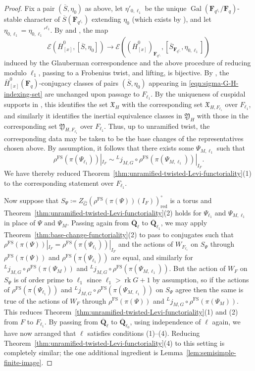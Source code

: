 \documentclass[reqno]{amsart}
\numberwithin{equation}{subsection}
\newcommand{\F}{\mathbf{F}}
\newcommand{\Q}{\mathbf{Q}}
\newcommand{\Gal}{\operatorname{Gal}}
\newcommand{\ol}[1]{\overline{#1}}
\newcommand{\wh}[1]{\widehat{#1}}
\newcommand{\ld}{{}^L}
\newcommand\cE{\mathcal{E}}
\DeclareMathOperator{\FS}{FS}
\DeclareMathOperator{\red}{red}
\DeclareMathOperator{\rk}{rk}
\theoremstyle{remark}
\numberwithin{equation}{subsection}
\numberwithin{figure}{subsection}
\begin{document}
\begin{proof}
Fix a pair $(\ol S, \eta_0)$ as above, let $\eta'_{0,\ell_1}$ be the unique $\Gal(\F_{q^{\ell_1}}/\F_q)$-stable character of $\ol S(\F_{q^{\ell_1}})$ extending $\eta_0$ (which exists by \cite[Proposition~4.3.4(1)]{Cot26b}), and let $\eta_{0,\ell_1} = \eta_{0,\ell_1}'^{\ell_1}$. By \cite[Corollary~4.4.1]{Cot26b} and \cite[Part III, no.\ 15.5, Proposition 43]{Serre77}, the map
\[
\cE(\ol H^0_{[x]}, [\ol S, \eta_0]) \to \cE((\ol H^0_{[x]})_{\F_{q^{\ell_1}}}, [\ol S_{\F_{q^{\ell_1}}}, \eta_{0,\ell_1}])
\]
induced by the Glauberman correspondence and the above procedure of reducing modulo $\ell_1$, passing to a Frobenius twist, and lifting, is bijective. By \cite[Corollary~4.4.2]{Cot26b}, the $\ol H^0_{[x]}(\F_q)$-conjugacy classes of pairs $(\ol S,\eta_0)$ appearing in \eqref{eqn:sigma-G-H-indexing-set} are unchanged upon passage to $F_{\ell_1}$. By the uniqueness of cuspidal supports in \cite[Lemma~2.10.2]{Cot26b}, this identifies the set $\mathfrak{X}_H$ with the corresponding set $\mathfrak{X}_{H,F_{\ell_1}}$ over $F_{\ell_1}$, and similarly it identifies the inertial equivalence classes in $\mathfrak{Y}_H$ with those in the corresponding set $\mathfrak{Y}_{H,F_{\ell_1}}$ over $F_{\ell_1}$. Thus, up to unramified twist, the corresponding data may be taken to be the base changes of the representatives chosen above. By assumption, it follows that there exists some $\Psi_{M,\ell_1}$ such that
\[
\rho^{\FS}(\pi(\Psi_{\ell_1}))|_{I_F} \sim \ld j_{M,G} \circ \rho^{\FS}(\pi(\Psi_{M,\ell_1}))|_{I_F}.
\]
We have thereby reduced Theorem~\ref{thm:unramified-twisted-Levi-functoriality}(1) to the corresponding statement over $F_{\ell_1}$.

Now suppose that $S_\Psi\coloneqq Z_{\wh G}(\rho^{\FS}(\pi(\Psi))(I_F))^\circ_{\red}$ is a torus and Theorem~\ref{thm:unramified-twisted-Levi-functoriality}(2) holds for $\Psi_{\ell_1}$ and $\Psi_{M,\ell_1}$ in place of $\Psi$ and $\Psi_M$. Passing again from $\ol\Q_\ell$ to $\ol\Q_{\ell_1}$, we may apply Theorem~\ref{thm:base-change-functoriality}(2) to pass to conjugates such that $\rho^{\FS}(\pi(\Psi))|_{I_F} = \rho^{\FS}(\pi(\Psi_{\ell_1}))|_{I_F}$ and the actions of $W_{F_{\ell_1}}$ on $S_\Psi$ through $\rho^{\FS}(\pi(\Psi))$ and $\rho^{\FS}(\pi(\Psi_{\ell_1}))$ are equal, and similarly for $\ld j_{M,G} \circ \rho^{\FS}(\pi(\Psi_M))$ and $\ld j_{M,G} \circ \rho^{\FS}(\pi(\Psi_{M,\ell_1}))$. But the action of $W_F$ on $S_\Psi$ is of order prime to $\ell_1$ since $\ell_1 > \rk G + 1$ by assumption, so if the actions of $\rho^{\FS}(\pi(\Psi_{\ell_1}))$ and $\ld j_{M,G} \circ \rho^{\FS}(\pi(\Psi_{M,\ell_1}))$ on $S_\Psi$ agree then the same is true of the actions of $W_F$ through $\rho^{\FS}(\pi(\Psi))$ and $\ld j_{M,G} \circ \rho^{\FS}(\pi(\Psi_M))$. This reduces Theorem~\ref{thm:unramified-twisted-Levi-functoriality}(1) and (2) from $F$ to $F_{\ell_1}$. By passing from $\ol\Q_\ell$ to $\ol\Q_{\ell_0}$, using independence of $\ell$ again, we have now arranged that $\ell$ satisfies conditions (1)--(4). Reducing Theorem~\ref{thm:unramified-twisted-Levi-functoriality}(4) to this setting is completely similar; the one additional ingredient is Lemma~\ref{lem:semisimple-finite-image}.
\end{proof}
\end{document}
